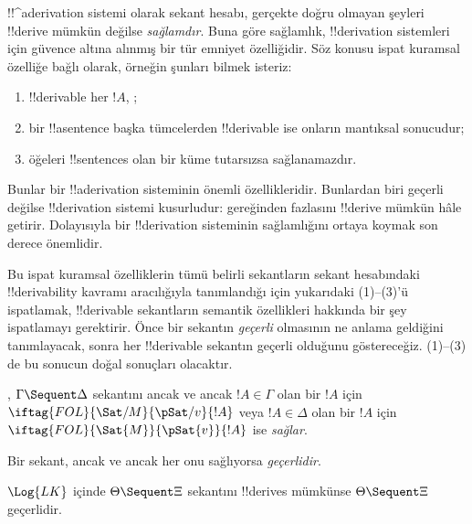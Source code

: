 \documentclass[../../../include/open-logic-section]{subfiles}
\begin{document}
      {}
      {}


\begin{explain}
!!^a{derivation} sistemi olarak sekant hesabı, gerçekte doğru olmayan
şeyleri !!{derive} mümkün değilse \emph{sağlamdır}. Buna göre sağlamlık,
!!{derivation} sistemleri için güvence altına alınmış bir tür emniyet
özelliğidir. Söz konusu ispat kuramsal özelliğe bağlı olarak, örneğin şunları
bilmek isteriz:
\begin{enumerate}
\item !!{derivable} her $!A$, ;
\item bir !!a{sentence} başka tümcelerden !!{derivable} ise onların mantıksal
  sonucudur;
\item öğeleri !!{sentence}s olan bir küme tutarsızsa sağlanamazdır.
\end{enumerate}
Bunlar bir !!a{derivation} sisteminin önemli özellikleridir. Bunlardan biri
geçerli değilse !!{derivation} sistemi kusurludur: gereğinden fazlasını
!!{derive} mümkün hâle getirir. Dolayısıyla bir !!{derivation} sisteminin sağlamlığını ortaya
koymak son derece önemlidir.

Bu ispat kuramsal özelliklerin tümü belirli sekantların sekant hesabındaki
!!{derivability} kavramı aracılığıyla tanımlandığı için yukarıdaki (1)--(3)'ü
ispatlamak, !!{derivable} sekantların semantik özellikleri hakkında bir şey
ispatlamayı gerektirir. Önce bir sekantın \emph{geçerli} olmasının ne anlama
geldiğini tanımlayacak, sonra her !!{derivable} sekantın geçerli olduğunu
göstereceğiz. (1)--(3) de bu sonucun doğal sonuçları olacaktır.
\end{explain}

\begin{defn}
,
  $\Gamma\Sequent\Delta$ sekantını ancak ve ancak $!A\in\Gamma$ olan bir
  $!A$ için $\iftag{FOL}{\Sat/{M}}{\pSat/{v}}{!A}$ veya $!A\in\Delta$ olan
  bir $!A$ için $\iftag{FOL}{\Sat{M}}{\pSat{v}}{!A}$ ise \emph{sağlar}.

Bir sekant, ancak ve ancak her  onu sağlıyorsa \emph{geçerlidir}.
\end{defn}

\begin{thm}[Sağlamlık]
 $\Log{LK}$ içinde $\Theta\Sequent\Xi$ sekantını
!!{derive}s mümkünse $\Theta\Sequent\Xi$ geçerlidir.
\end{thm}
\end{document}
